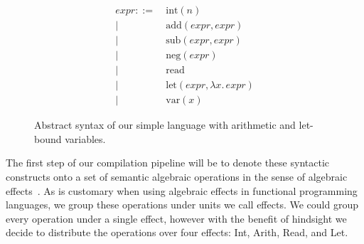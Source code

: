 \documentclass[a4paper,UKenglish,cleveref, autoref, thm-restate, anonymous]{oasics-v2021}
\begin{document}
\begin{figure}[ht]
  \begin{align*}
    \mathit{expr} ::= &\ \mathrm{int}(n) \\
           | &\ \mathrm{add}(\mathit{expr},\mathit{expr}) \\
           | &\ \mathrm{sub}(\mathit{expr},\mathit{expr}) \\
           | &\ \mathrm{neg}(\mathit{expr}) \\
           | &\ \mathrm{read} \\
           | &\ \mathrm{let}(\mathit{expr},\lambda \mathit{x}.\,\mathit{expr}) \\
           | &\ \mathrm{var}(\mathit{x})
  \end{align*}
  \caption{Abstract syntax of our simple language with arithmetic and let-bound variables.}\label{fig:source-absyn}
\end{figure}

The first step of our compilation pipeline will be to denote these syntactic constructs onto a set of semantic algebraic operations in the sense of algebraic effects~\cite{10.1007/3-540-45315-6_1}.
As is customary when using algebraic effects in functional programming languages, we group these operations under units we call effects.
We could group every operation under a single effect, however with the benefit of hindsight we decide to distribute the operations over four effects: Int, Arith, Read, and Let.
\end{document}
